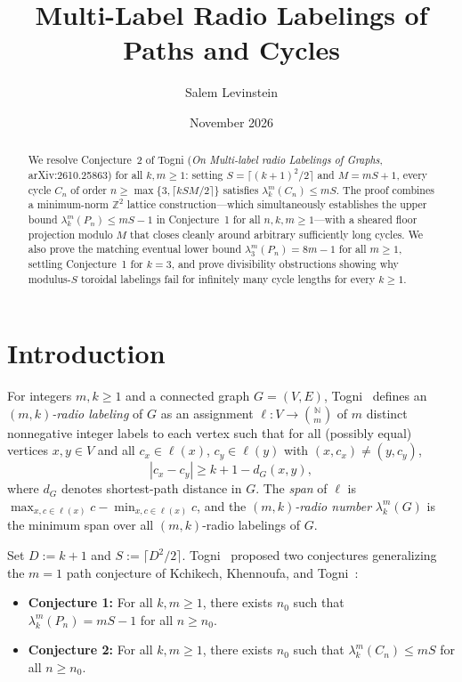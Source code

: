 \documentclass[11pt]{article}
\title{Multi-Label Radio Labelings of Paths and Cycles}
\author{Salem Levinstein}
\date{November 2026}
\begin{document}
\maketitle

\begin{abstract}
We resolve Conjecture~2 of Togni (\emph{On Multi-label radio Labelings of Graphs}, arXiv:2610.25863) for all $k, m \ge 1$: setting $S = \lceil (k+1)^2 / 2 \rceil$ and $M = mS + 1$, every cycle $C_n$ of order $n \ge \max\{3, \lceil kSM/2 \rceil\}$ satisfies $\lambda_k^m(C_n) \le mS$. The proof combines a minimum-norm $\mathbb{Z}^2$ lattice construction—which simultaneously establishes the upper bound $\lambda_k^m(P_n) \le mS - 1$ in Conjecture~1 for all $n, k, m \ge 1$—with a sheared floor projection modulo $M$ that closes cleanly around arbitrary sufficiently long cycles. We also prove the matching eventual lower bound $\lambda_3^m(P_n) = 8m - 1$ for all $m \ge 1$, settling Conjecture~1 for $k = 3$, and prove divisibility obstructions showing why modulus-$S$ toroidal labelings fail for infinitely many cycle lengths for every $k \ge 1$.
\end{abstract}

\section{Introduction}

For integers $m, k \ge 1$ and a connected graph $G = (V, E)$, Togni~\cite{Togni2026} defines an \emph{$(m, k)$-radio labeling} of $G$ as an assignment $\ell : V \to \binom{\mathbb{N}}{m}$ of $m$ distinct nonnegative integer labels to each vertex such that for all (possibly equal) vertices $x, y \in V$ and all $c_x \in \ell(x)$, $c_y \in \ell(y)$ with $(x, c_x) \neq (y, c_y)$,
\[
|c_x - c_y| \ge k + 1 - d_G(x, y),
\]
where $d_G$ denotes shortest-path distance in $G$. The \emph{span} of $\ell$ is $\max_{x, c \in \ell(x)} c - \min_{x, c \in \ell(x)} c$, and the \emph{$(m, k)$-radio number} $\lambda_k^m(G)$ is the minimum span over all $(m, k)$-radio labelings of $G$.

Set $D := k + 1$ and $S := \lceil D^2 / 2 \rceil$. Togni~\cite[Section~5]{Togni2026} proposed two conjectures generalizing the $m = 1$ path conjecture of Kchikech, Khennoufa, and Togni~\cite{KKT2007}:
\begin{itemize}
\item \textbf{Conjecture 1:} For all $k, m \ge 1$, there exists $n_0$ such that $\lambda_k^m(P_n) = mS - 1$ for all $n \ge n_0$.
\item \textbf{Conjecture 2:} For all $k, m \ge 1$, there exists $n_0$ such that $\lambda_k^m(C_n) \le mS$ for all $n \ge n_0$.
\end{itemize}
\end{document}
